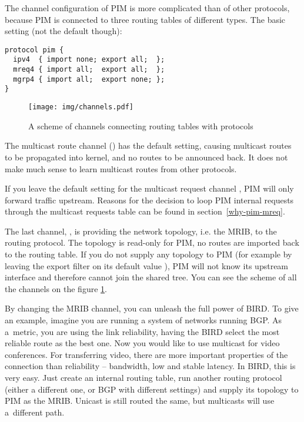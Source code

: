 The channel configuration of PIM is more complicated than of other protocols,
because PIM is connected to three routing tables of different types. The basic
setting (not the default though):

\begin{lstlisting}
protocol pim {
  ipv4  { import none; export all;  };
  mreq4 { import all;  export all;  };
  mgrp4 { import all;  export none; };
}
\end{lstlisting}

\begin{figure}[htp]
\centering
\texttt{[image: img/channels.pdf]}
\caption{A scheme of channels connecting routing tables with protocols}
\label{channels}
\end{figure}

\noindent The multicast route channel () has the default setting, causing
multicast routes to be propagated into kernel, and no routes to be announced
back. It does not make much sense to learn multicast routes from other
protocols.

If you leave the default  setting for the multicast request
channel , PIM will only forward traffic upstream. Reasons for the
decision to loop PIM internal requests through the multicast requests table can
be found in section~\ref{why-pim-mreq}.

The last channel, , is providing the network topology, i.e. the MRIB,
to the routing protocol. The topology is read-only for PIM, no routes are
imported back to the routing table. If you do not supply any topology to PIM
(for example by leaving the export filter on its default value ), PIM
will not know its upstream interface and therefore cannot join the shared
tree. You can see the scheme of all the channels on the figure \ref{channels}.

By changing the MRIB channel, you can unleash the full power of BIRD. To give
an example, imagine you are running a system of networks running BGP. As
a~metric, you are using the link reliability, having the BIRD select the most
reliable route as the best one. Now you would like to use multicast for
video conferences. For transferring video, there are more important properties of
the connection than reliability -- bandwidth, low and stable latency. In BIRD,
this is very easy. Just create an internal routing table, run another routing
protocol (either a different one, or BGP with different settings) and supply
its topology to PIM as the MRIB. Unicast is still routed the same, but
multicasts will use a~different path.

